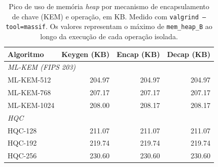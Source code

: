 \begin{table}[ht]
\centering
\caption{Pico de uso de memória \textit{heap} por mecanismo de
encapsulamento de chave (KEM) e operação, em KB.
Medido com \texttt{valgrind --tool=massif}.
Os valores representam o máximo de \texttt{mem\_heap\_B}
ao longo da execução de cada operação isolada.}
\label{tab:heap_kem}
\begin{tabular}{lrrr}
\toprule
\textbf{Algoritmo} & \textbf{Keygen (KB)} & \textbf{Encap (KB)} & \textbf{Decap (KB)} \\
\midrule
\multicolumn{4}{l}{\textit{ML-KEM (FIPS 203)}} \\[2pt]
\quad ML-KEM-512  & 204.97 & 204.97 & 204.97 \\
\quad ML-KEM-768  & 207.17 & 207.17 & 207.17 \\
\quad ML-KEM-1024 & 208.00 & 208.17 & 208.17 \\
\midrule
\multicolumn{4}{l}{\textit{HQC}} \\[2pt]
\quad HQC-128 & 211.07 & 211.07 & 211.07 \\
\quad HQC-192 & 219.74 & 219.74 & 219.74 \\
\quad HQC-256 & 230.60 & 230.60 & 230.60 \\
\bottomrule
\end{tabular}
\end{table}


